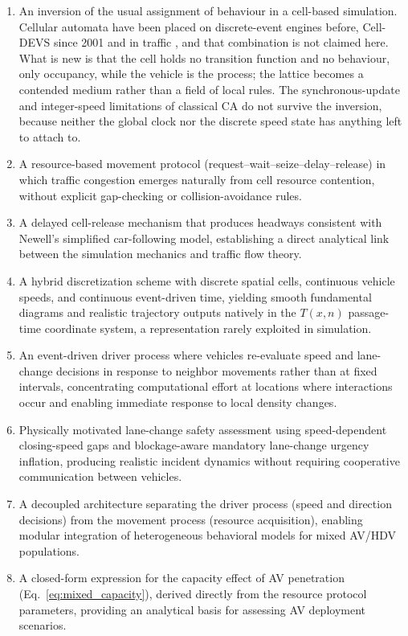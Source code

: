 \documentclass[review,authoryear]{elsarticle}
\begin{document}
\begin{enumerate}
    \item An inversion of the usual assignment of behaviour in a cell-based simulation. Cellular automata have been placed on discrete-event engines before, Cell-DEVS \citep{wainer2001timed,wainer2014cellular} since 2001 and in traffic \citep{davidson2000specifying,wainer2006atlas}, and that combination is not claimed here. What is new is that the cell holds no transition function and no behaviour, only occupancy, while the vehicle is the process; the lattice becomes a contended medium rather than a field of local rules. The synchronous-update and integer-speed limitations of classical CA do not survive the inversion, because neither the global clock nor the discrete speed state has anything left to attach to.

    \item A resource-based movement protocol (request--wait--seize--delay--release) in which traffic congestion emerges naturally from cell resource contention, without explicit gap-checking or collision-avoidance rules.

    \item A delayed cell-release mechanism that produces headways consistent with Newell's simplified car-following model, establishing a direct analytical link between the simulation mechanics and traffic flow theory.

    \item A hybrid discretization scheme with discrete spatial cells, continuous vehicle speeds, and continuous event-driven time, yielding smooth fundamental diagrams and realistic trajectory outputs natively in the $T(x,n)$ passage-time coordinate system, a representation rarely exploited in simulation.

    \item An event-driven driver process where vehicles re-evaluate speed and lane-change decisions in response to neighbor movements rather than at fixed intervals, concentrating computational effort at locations where interactions occur and enabling immediate response to local density changes.

    \item Physically motivated lane-change safety assessment using speed-dependent closing-speed gaps and blockage-aware mandatory lane-change urgency inflation, producing realistic incident dynamics without requiring cooperative communication between vehicles.

    \item A decoupled architecture separating the driver process (speed and direction decisions) from the movement process (resource acquisition), enabling modular integration of heterogeneous behavioral models for mixed AV/HDV populations.

    \item A closed-form expression for the capacity effect of AV penetration (Eq.~\ref{eq:mixed_capacity}), derived directly from the resource protocol parameters, providing an analytical basis for assessing AV deployment scenarios.
\end{enumerate}
\end{document}
